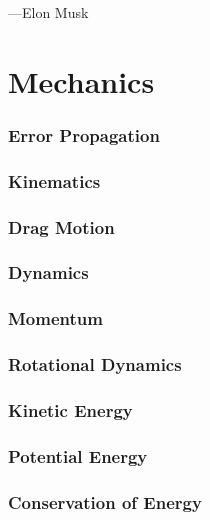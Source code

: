 \documentclass{article}
\begin{document}
---Elon Musk \bigskip

\tableofcontents
\clearpage

\part{Mechanics}

\section{Error Propagation}


\section{Kinematics}


\section{Drag Motion}


\section{Dynamics}


\section{Momentum}


\section{Rotational Dynamics}


\section{Kinetic Energy}


\section{Potential Energy}


\section{Conservation of Energy}

\end{document}
